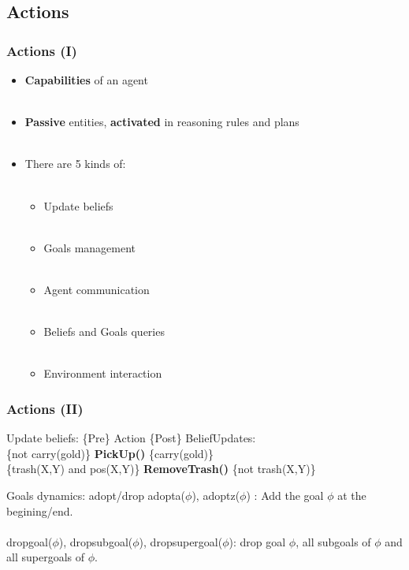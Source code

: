 \subsection{Actions}  
  \begin{frame}
    \frametitle{Actions (I)}
    \begin{itemize}
      \item \textbf{Capabilities} of an agent \\~\\
      \item \textbf{Passive} entities, \textbf{activated} in reasoning rules and plans\\~\\
      \item There are 5 kinds of:\\~\\
      \begin{itemize}
        \item Update beliefs\\~\\
        \item Goals management \\~\\
        \item Agent communication\\~\\
        \item Beliefs and Goals queries\\~\\
        \item Environment interaction
      \end{itemize}
    \end{itemize}
  \end{frame}
  \begin{frame}
    \frametitle{Actions (II)}
    \begin{block}{Update beliefs: \{Pre\} Action \{Post\}}
      BeliefUpdates:\\
      \tab \{not carry(gold)\} \textbf{PickUp()} \{carry(gold)\}\\
      \tab \{trash(X,Y) and pos(X,Y)\} \textbf{RemoveTrash()} \{not trash(X,Y)\}
    \end{block} 

    \begin{block}{Goals dynamics: adopt/drop}
      adopta($\phi$), adoptz($\phi$) : Add the goal $\phi$ at the begining/end.\\~\\
      dropgoal($\phi$), dropsubgoal($\phi$), dropsupergoal($\phi$): drop goal $\phi$, all subgoals of $\phi$ and all supergoals of $\phi$.
    \end{block}
    
  \end{frame}

